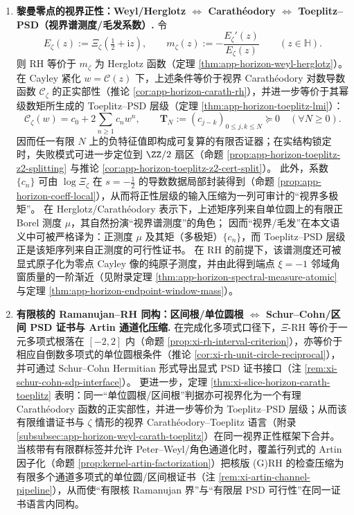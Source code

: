 \begin{enumerate}
  \item \textbf{黎曼零点的视界正性：Weyl/Herglotz \(\Leftrightarrow\) Carath\'eodory \(\Leftrightarrow\) Toeplitz--PSD（视界谱测度/毛发系数）.}
  令
  \[
    E_{\zeta}(z):=\Xi_{\zeta}\!\left(\tfrac12+\mathrm{i}z\right),\qquad
    m_{\zeta}(z):=-\frac{E_{\zeta}'(z)}{E_{\zeta}(z)}\qquad(z\in\mathbb{H}).
  \]
  则 RH 等价于 \(m_{\zeta}\) 为 Herglotz 函数（定理 \ref{thm:app-horizon-weyl-herglotz}）。
  在 Cayley 紧化 \(w=\mathcal{C}(z)\) 下，上述条件等价于视界 Carath\'eodory 对数导数函数 \(\mathscr{C}_{\zeta}\) 的正实部性（推论 \ref{cor:app-horizon-carath-rh}），并进一步等价于其幂级数矩所生成的 Toeplitz--PSD 层级（定理 \ref{thm:app-horizon-toeplitz-lmi}）：
  \[
    \mathscr{C}_{\zeta}(w)=c_0+2\sum_{n\ge 1}c_n w^n,
    \qquad
    \mathbf{T}_N:=(c_{j-k})_{0\le j,k\le N}\succeq 0\quad(\forall N\ge 0).
  \]
  因而任一有限 \(N\) 上的负特征值即构成可复算的有限否证器；在实结构锁定时，失败模式可进一步定位到 \(\ZZ/2\) 扇区（命题 \ref{prop:app-horizon-toeplitz-z2-splitting} 与推论 \ref{cor:app-horizon-toeplitz-z2-cert-split}）。
  此外，系数 \(\{c_n\}\) 可由 \(\log\Xi_{\zeta}\) 在 \(s=-\tfrac12\) 的导数数据局部封装得到（命题 \ref{prop:app-horizon-coeff-local}），从而将正性层级的输入压缩为一列可审计的“视界多极矩”。
  在 Herglotz/Carath\'eodory 表示下，上述矩序列来自单位圆上的有限正 Borel 测度 \(\mu\)，其自然扮演“视界谱测度”的角色；
  因而“视界/毛发”在本文语义中可被严格译为：正测度 \(\mu\) 及其矩（多极矩）\(\{c_n\}\)，而 Toeplitz--PSD 层级正是该矩序列来自正测度的可行性证书。
  在 RH 的前提下，该谱测度还可被显式原子化为零点 Cayley 像的纯原子测度，并由此得到端点 \(\xi=-1\) 邻域角窗质量的一阶渐近（见附录定理 \ref{thm:app-horizon-spectral-measure-atomic} 与定理 \ref{thm:app-horizon-endpoint-window-mass}）。

  \item \textbf{有限核的 Ramanujan--RH 同构：区间根/单位圆根 \(\Leftrightarrow\) Schur--Cohn/区间 PSD 证书与 Artin 通道化压缩.}
  在完成化多项式口径下，\(\Xi\)-RH 等价于一元多项式根落在 \([-2,2]\) 内（命题 \ref{prop:xi-rh-interval-criterion}），亦等价于相应自倒数多项式的单位圆根条件（推论 \ref{cor:xi-rh-unit-circle-reciprocal}），并可通过 Schur--Cohn Hermitian 形式导出显式 PSD 证书接口（注 \ref{rem:xi-schur-cohn-sdp-interface}）。
  更进一步，定理 \ref{thm:xi-slice-horizon-carath-toeplitz} 表明：同一“单位圆根/区间根”判据亦可视界化为一个有理 Carath\'eodory 函数的正实部性，并进一步等价为 Toeplitz--PSD 层级；从而该有限维谱证书与 \(\zeta\) 情形的视界 Carath\'eodory--Toeplitz 语言（附录 \ref{subsubsec:app-horizon-weyl-carath-toeplitz}）在同一视界正性框架下合并。
  当核带有有限群标签并允许 Peter--Weyl/角色通道化时，覆盖行列式的 Artin 因子化（命题 \ref{prop:kernel-artin-factorization}）把核版 (G)RH 的检查压缩为有限多个通道多项式的单位圆/区间根证书（注 \ref{rem:xi-artin-channel-pipeline}），从而使“有限核 Ramanujan 界”与“有限层 PSD 可行性”在同一证书语言内同构。


\end{enumerate}
